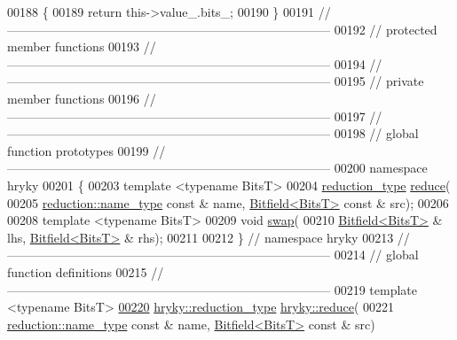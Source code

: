 \begin{DoxyCode}
00188 \textcolor{keyword}{}\{
00189     \textcolor{keywordflow}{return} this->value\_.bits\_;
00190 \}
00191 \textcolor{comment}{//
      ------------------------------------------------------------------------------}
00192 \textcolor{comment}{// protected member functions}
00193 \textcolor{comment}{//
      ------------------------------------------------------------------------------}
00194 \textcolor{comment}{//
      ------------------------------------------------------------------------------}
00195 \textcolor{comment}{// private member functions}
00196 \textcolor{comment}{//
      ------------------------------------------------------------------------------}
00197 \textcolor{comment}{//
      ------------------------------------------------------------------------------}
00198 \textcolor{comment}{// global function prototypes}
00199 \textcolor{comment}{//
      ------------------------------------------------------------------------------}
00200 \textcolor{keyword}{namespace }hryky
00201 \{
00203     \textcolor{keyword}{template} <\textcolor{keyword}{typename} BitsT>
00204     \hyperlink{classhryky_1_1_intrusive_ptr}{reduction_type} \hyperlink{namespacehryky_af41cb3af6766761da0ff21b84527a52c}{reduce}(
00205         \hyperlink{classhryky_1_1reduction_1_1_string}{reduction::name_type} \textcolor{keyword}{const} & name, \hyperlink{classhryky_1_1_bitfield}{Bitfield<BitsT>} \textcolor{keyword}{const} & src);
00206 
00208     \textcolor{keyword}{template} <\textcolor{keyword}{typename} BitsT>
00209     \textcolor{keywordtype}{void} \hyperlink{namespacehryky_a4282146df5ea2b68cb667896a2205909}{swap}(
00210         \hyperlink{classhryky_1_1_bitfield}{Bitfield<BitsT>} & lhs, \hyperlink{classhryky_1_1_bitfield}{Bitfield<BitsT>} & rhs);
00211 
00212 \} \textcolor{comment}{// namespace hryky}
00213 \textcolor{comment}{//
      ------------------------------------------------------------------------------}
00214 \textcolor{comment}{// global function definitions}
00215 \textcolor{comment}{//
      ------------------------------------------------------------------------------}
00219 \textcolor{comment}{}\textcolor{keyword}{template} <\textcolor{keyword}{typename} BitsT>
\hypertarget{bitfield_8h_source_l00220}{}\hyperlink{namespacehryky_a508b9129a4c0e791849603a3ed4c5f32}{00220} \hyperlink{classhryky_1_1_intrusive_ptr}{hryky::reduction_type} \hyperlink{namespacehryky_af41cb3af6766761da0ff21b84527a52c}{hryky::reduce}(
00221     \hyperlink{classhryky_1_1reduction_1_1_string}{reduction::name_type} \textcolor{keyword}{const} & name, \hyperlink{classhryky_1_1_bitfield}{Bitfield<BitsT>} \textcolor{keyword}{const} & src)

\end{DoxyCode}
